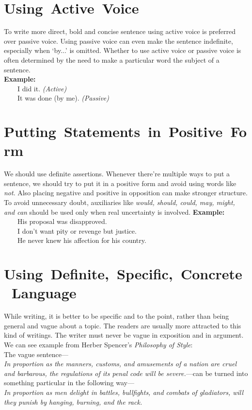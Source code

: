 \documentclass[12pt]{report}
\newcommand{\xmpl}{\textbf{Example:}\\} %
\newcommand{\indnt}{\ \ \ \ } %
\begin{document}
\section{\mbox{Using Active Voice}}
To write more direct, bold and concise sentence using active voice is preferred over passive voice. Using passive voice can even make the sentence indefinite, especially when `by...' is omitted. Whether to use active voice or passive voice is often determined by the need to make a particular word the subject of a sentence.\\
\xmpl
\indnt I did it. \emph{(Active)}\\
\indnt It was done (by me). \emph{(Passive)}


\section{\mbox{Putting Statements in Positive Form}}
We should use definite assertions. Whenever there're multiple ways to put a sentence, we should try to put it in a positive form and avoid using words like \emph{not}. Also placing negative and positive in opposition can make stronger structure. To avoid unnecessary doubt, auxiliaries like \emph{would, should, could, may, might, \emph{and} can} should be used only when real uncertainty is involved.
\xmpl
\indnt His proposal was disapproved.\\
\indnt I don't want pity or revenge but justice.\\
\indnt He never knew his affection for his country.\\


\section{\mbox{Using Definite, Specific, Concrete Language}}
While writing, it is better to be specific and to the point, rather than being general and vague about a topic. The readers are usually more attracted to this kind of writings. The writer must never be vague in exposition and in argument. We can see example from Herber Spencer's \textit{Philosophy of Style}:\\
The vague sentence---\\ \textit{In proportion as the manners, customs, and amusements of a nation are cruel and barbarous, the regulations of its penal code will be severe.}---can be turned into something particular in the following way---\\
\textit{In proportion as men delight in battles, bullfights, and combats of gladiators, will they punish by hanging, burning, and the rack.}\\
\end{document}
